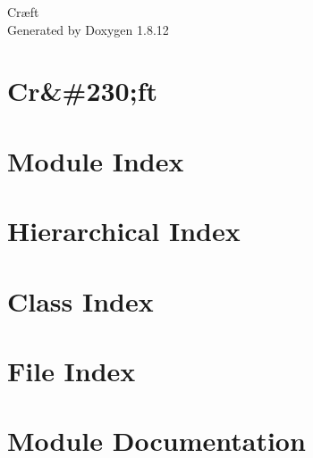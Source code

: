 \documentclass[twoside]{book}
\newcommand{\+}{\discretionary{\mbox{\scriptsize$\hookleftarrow$}}{}{}}
\newcommand{\clearemptydoublepage}{%
  \newpage{\pagestyle{empty}\cleardoublepage}%
}
\begin{document}
\hypersetup{pageanchor=false,
             bookmarksnumbered=true,
             pdfencoding=unicode
            }
\begin{titlepage}
\vspace*{7cm}
\begin{center}%
{\Large Cræft }\\
\vspace*{1cm}
{\large Generated by Doxygen 1.8.12}\\
\end{center}
\end{titlepage}
\clearemptydoublepage
{}
\tableofcontents
\clearemptydoublepage
{}
\hypersetup{pageanchor=true}

\chapter{Cr\&\#230;ft}
\label{md__r_e_a_d_m_e}
\hypertarget{md__r_e_a_d_m_e}{}

\chapter{Module Index}

\chapter{Hierarchical Index}

\chapter{Class Index}

\chapter{File Index}

\chapter{Module Documentation}


\end{document}
